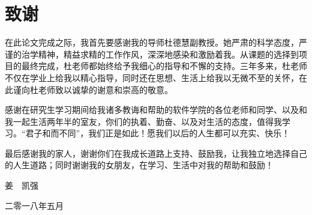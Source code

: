 {\fangsong
	\chapter*{致\qquad 谢}\vskip 2mm
	\vspace{-1cm}
	\large{

		在此论文完成之际，我首先要感谢我的导师杜德慧副教授。她严肃的科学态度，严谨的治学精神，精益求精的工作作风，深深地感染和激励着我。从课题的选择到项目的最终完成，杜老师都始终给予我细心的指导和不懈的支持。三年多来，杜老师不仅在学业上给我以精心指导，同时还在思想、生活上给我以无微不至的关怀，在此谨向杜老师致以诚挚的谢意和崇高的敬意。
		
		感谢在研究生学习期间给我诸多教诲和帮助的软件学院的各位老师和同学、以及和我一起生活两年半的室友，你们的执着、勤奋、以及对生活的态度，值得我学习。“君子和而不同”，我们正是如此！愿我们以后的人生都可以充实、快乐！
		
		最后感谢我的家人，谢谢你们在我成长道路上支持、鼓励我，让我独立地选择自己的人生道路；同时谢谢我的女朋友，在学习、生活中对我的帮助和鼓励！

	}
	
	\vspace{0.2cm}
	
	\vspace{0.2cm} \hspace{9.8cm}  
	姜~~凯强
	
	\hspace{9cm}  二零一八年五月
}